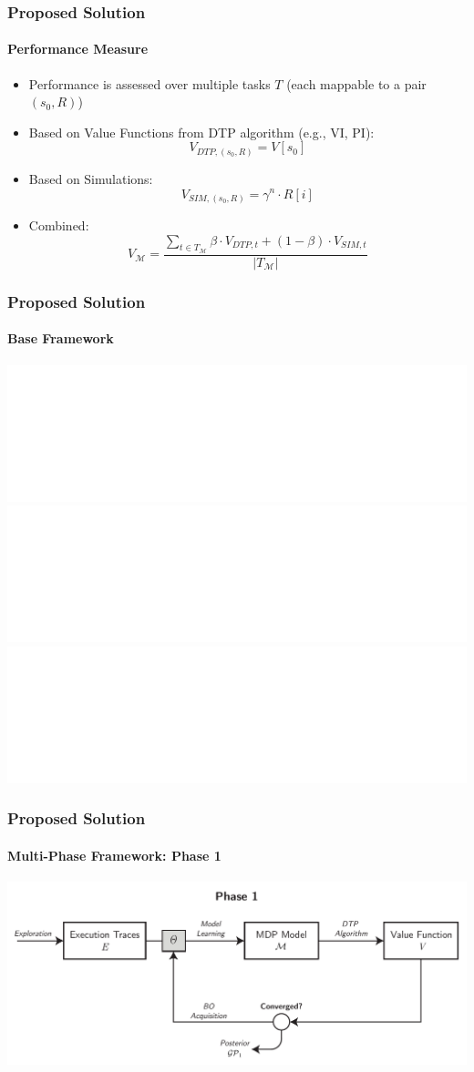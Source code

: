 \begin{frame}
\frametitle{Proposed Solution}
\framesubtitle{Performance Measure}
\begin{itemize}
	\item<1-> \footnotesize Performance is assessed over multiple tasks $T$ (each mappable to a pair $(s_0, R)$)
	\item<2-> Based on Value Functions from DTP algorithm (e.g., VI, PI):
	$$V_{\mathit{DTP}, (s_0, R)} = V[s_0]$$
	\item<3-> Based on Simulations:
	$$V_{\mathit{SIM}, (s_0, R)} = \gamma^n \cdot R[i]$$
	\item<4-> Combined:
	$$V_{\mathcal{M}} = \frac{\sum_{t \in T_\mathcal{M}} \beta \cdot V_{\mathit{DTP}, t} + (1 - \beta) \cdot V_{\mathit{SIM}, t}}{|T_\mathcal{M}|}$$
%	
\end{itemize}

\end{frame}

\begin{frame}
\frametitle{Proposed Solution}
\framesubtitle{Base Framework}
	\vspace{-10pt}
	\begin{center}
		\includegraphics<1| handout:0>[width=1\textwidth]{figures/optimization-routine/learning-cycle-simplified-1.pdf}
		\includegraphics<2| handout:0>[width=1\textwidth]{figures/optimization-routine/learning-cycle-simplified-2.pdf}
		\includegraphics<3>[width=1\textwidth]{figures/optimization-routine/learning-cycle-simplified-3.pdf}
	\end{center}
\end{frame}

\begin{frame}
\frametitle{Proposed Solution}
\framesubtitle{Multi-Phase Framework: Phase 1}

\begin{center}
	\includegraphics[width=\textwidth]{figures/phase-1v2}
\end{center}

\end{frame}

